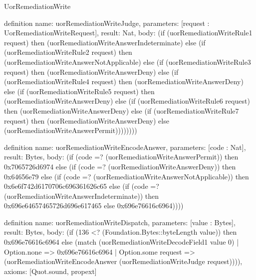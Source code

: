 \begin{lexlean}{UorRemediationWrite}
\begin{semanticmodule}
definition{
  name: uorRemediationWriteJudge,
  parameters: [request : UorRemediationWriteRequest],
  result: Nat,
  body: (if (uorRemediationWriteRule1 request) then (uorRemediationWriteAnswerIndeterminate) else (if (uorRemediationWriteRule2 request) then (uorRemediationWriteAnswerNotApplicable) else (if (uorRemediationWriteRule3 request) then (uorRemediationWriteAnswerDeny) else (if (uorRemediationWriteRule4 request) then (uorRemediationWriteAnswerDeny) else (if (uorRemediationWriteRule5 request) then (uorRemediationWriteAnswerDeny) else (if (uorRemediationWriteRule6 request) then (uorRemediationWriteAnswerDeny) else (if (uorRemediationWriteRule7 request) then (uorRemediationWriteAnswerDeny) else (uorRemediationWriteAnswerPermit))))))))
}

definition{
  name: uorRemediationWriteEncodeAnswer,
  parameters: [code : Nat],
  result: Bytes,
  body: (if (code =? (uorRemediationWriteAnswerPermit)) then 0x7065726d6974 else (if (code =? (uorRemediationWriteAnswerDeny)) then 0x64656e79 else (if (code =? (uorRemediationWriteAnswerNotApplicable)) then 0x6e6f742d6170706c696361626c65 else (if (code =? (uorRemediationWriteAnswerIndeterminate)) then 0x696e64657465726d696e617465 else 0x696e76616c6964))))
}

definition{
  name: uorRemediationWriteDispatch,
  parameters: [value : Bytes],
  result: Bytes,
  body: (if (136 <? (Foundation.Bytes::byteLength value)) then 0x696e76616c6964 else (match (uorRemediationWriteDecodeField1 value 0)
    | Option.none => 0x696e76616c6964
    | Option.some request => (uorRemediationWriteEncodeAnswer (uorRemediationWriteJudge request)))),
  axioms: [Quot.sound, propext]
}
\end{semanticmodule}
\end{lexlean}
